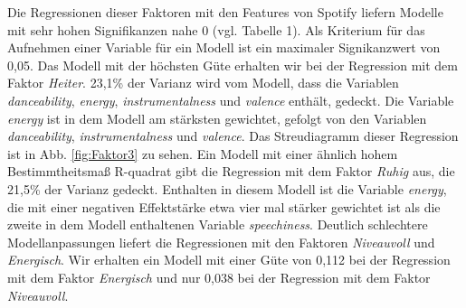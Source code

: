 Die Regressionen dieser Faktoren mit den Features von Spotify liefern Modelle mit sehr hohen Signifikanzen nahe 0 (vgl. Tabelle 1).
Als Kriterium für das Aufnehmen einer Variable für ein Modell ist ein maximaler Signikanzwert von  0,05.  
Das Modell mit der höchsten Güte erhalten wir bei der Regression mit dem Faktor \textit{Heiter}.
23,1\% der Varianz wird vom Modell, dass die Variablen \textit{danceability}, \textit{energy}, \textit{instrumentalness} und \textit{valence} enthält, gedeckt.
Die Variable \textit{energy} ist in dem Modell am stärksten gewichtet, gefolgt von den Variablen \textit{danceability},  \textit{instrumentalness} und \textit{valence}.
Das Streudiagramm dieser Regression ist in Abb. \ref{fig:Faktor3} zu sehen.    
Ein Modell mit einer ähnlich hohem Bestimmtheitsmaß R-quadrat gibt die Regression mit dem Faktor \textit{Ruhig} aus, die 21,5\% der Varianz gedeckt.
Enthalten in diesem Modell ist die Variable \textit{energy}, die mit einer negativen Effektstärke etwa vier mal stärker gewichtet ist als die zweite in dem Modell enthaltenen Variable \textit{speechiness}.
Deutlich schlechtere Modellanpassungen liefert die Regressionen mit den Faktoren \textit{Niveauvoll} und \textit{Energisch}.
Wir erhalten ein Modell mit einer Güte von 0,112 bei der Regression mit dem Faktor \textit{Energisch} und nur 0,038 bei der Regression mit dem Faktor \textit{Niveauvoll}.

